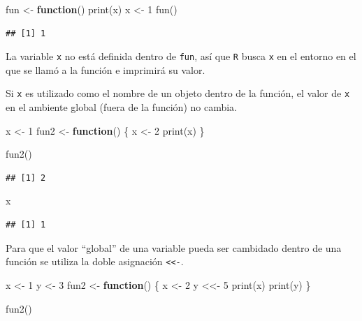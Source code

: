 \documentclass[
]{book}
\newenvironment{Shaded}{\begin{snugshade}}{\end{snugshade}}
\newcommand{\ControlFlowTok}[1]{\textcolor[rgb]{0.13,0.29,0.53}{\textbf{#1}}}
\newcommand{\DecValTok}[1]{\textcolor[rgb]{0.00,0.00,0.81}{#1}}
\newcommand{\FunctionTok}[1]{\textcolor[rgb]{0.00,0.00,0.00}{#1}}
\newcommand{\NormalTok}[1]{#1}
\newcommand{\OtherTok}[1]{\textcolor[rgb]{0.56,0.35,0.01}{#1}}
\theoremstyle{break}
\begin{document}
\begin{Shaded}
\begin{Highlighting}[]
\NormalTok{fun }\OtherTok{\textless{}{-}} \ControlFlowTok{function}\NormalTok{() }\FunctionTok{print}\NormalTok{(x)}
\NormalTok{x }\OtherTok{\textless{}{-}} \DecValTok{1}
\FunctionTok{fun}\NormalTok{()}
\end{Highlighting}
\end{Shaded}

\begin{verbatim}
## [1] 1
\end{verbatim}

La variable \texttt{x} no está definida dentro de \texttt{fun}, así que \texttt{R} busca
\texttt{x} en el entorno en el que se llamó a la función e imprimirá su valor.

Si \texttt{x} es utilizado como el nombre de un objeto dentro de la
función, el valor de \texttt{x} en el ambiente global (fuera de la función) no
cambia.

\begin{Shaded}
\begin{Highlighting}[]
\NormalTok{x }\OtherTok{\textless{}{-}} \DecValTok{1}
\NormalTok{fun2 }\OtherTok{\textless{}{-}} \ControlFlowTok{function}\NormalTok{() \{}
\NormalTok{    x }\OtherTok{\textless{}{-}} \DecValTok{2}
    \FunctionTok{print}\NormalTok{(x)}
\NormalTok{\}}

\FunctionTok{fun2}\NormalTok{()}
\end{Highlighting}
\end{Shaded}

\begin{verbatim}
## [1] 2
\end{verbatim}

\begin{Shaded}
\begin{Highlighting}[]
\NormalTok{x}
\end{Highlighting}
\end{Shaded}

\begin{verbatim}
## [1] 1
\end{verbatim}

Para que el valor ``global'' de una variable pueda ser cambidado dentro de
una función se utiliza la doble asignación \texttt{\textless{}\textless{}-}.

\begin{Shaded}
\begin{Highlighting}[]
\NormalTok{x }\OtherTok{\textless{}{-}} \DecValTok{1}
\NormalTok{y }\OtherTok{\textless{}{-}} \DecValTok{3}
\NormalTok{fun2 }\OtherTok{\textless{}{-}} \ControlFlowTok{function}\NormalTok{() \{}
\NormalTok{    x }\OtherTok{\textless{}{-}} \DecValTok{2}
\NormalTok{    y }\OtherTok{\textless{}\textless{}{-}} \DecValTok{5}
    \FunctionTok{print}\NormalTok{(x)}
    \FunctionTok{print}\NormalTok{(y)}
\NormalTok{\}}

\FunctionTok{fun2}\NormalTok{()}
\end{Highlighting}
\end{Shaded}
\end{document}
